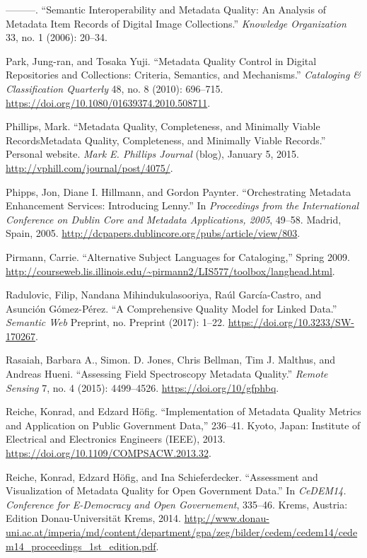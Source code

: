 ———. “Semantic Interoperability and Metadata Quality: An Analysis of Metadata Item Records of Digital Image Collections.” \emph{Knowledge Organization} 33, no. 1 (2006): 20–34.

Park, Jung-ran, and Tosaka Yuji. “Metadata Quality Control in Digital Repositories and Collections: Criteria, Semantics, and Mechanisms.” \emph{Cataloging \& Classification Quarterly} 48, no. 8 (2010): 696–715. \url{https://doi.org/10.1080/01639374.2010.508711}.

Phillips, Mark. “Metadata Quality, Completeness, and Minimally Viable RecordsMetadata Quality, Completeness, and Minimally Viable Records.” Personal website. \emph{Mark E. Phillips Journal} (blog), January 5, 2015. \url{http://vphill.com/journal/post/4075/}.

Phipps, Jon, Diane I. Hillmann, and Gordon Paynter. “Orchestrating Metadata Enhancement Services: Introducing Lenny.” In \emph{Proceedings from the International Conference on Dublin Core and Metadata Applications, 2005}, 49–58. Madrid, Spain, 2005. \url{http://dcpapers.dublincore.org/pubs/article/view/803}.

Pirmann, Carrie. “Alternative Subject Languages for Cataloging,” Spring 2009. \url{http://courseweb.lis.illinois.edu/~pirmann2/LIS577/toolbox/langhead.html}.

Radulovic, Filip, Nandana Mihindukulasooriya, Raúl García-Castro, and Asunción Gómez-Pérez. “A Comprehensive Quality Model for Linked Data.” \emph{Semantic Web} Preprint, no. Preprint (2017): 1–22. \url{https://doi.org/10.3233/SW-170267}.

Rasaiah, Barbara A., Simon. D. Jones, Chris Bellman, Tim J. Malthus, and Andreas Hueni. “Assessing Field Spectroscopy Metadata Quality.” \emph{Remote Sensing} 7, no. 4 (2015): 4499–4526. \url{https://doi.org/10/gfphbq}.

Reiche, Konrad, and Edzard Höfig. “Implementation of Metadata Quality Metrics and Application on Public Government Data,” 236–41. Kyoto, Japan: Institute of Electrical and Electronics Engineers (IEEE), 2013. \url{https://doi.org/10.1109/COMPSACW.2013.32}.

Reiche, Konrad, Edzard Höfig, and Ina Schieferdecker. “Assessment and Visualization of Metadata Quality for Open Government Data.” In \emph{CeDEM14. Conference for E-Democracy and Open Governement}, 335–46. Krems, Austria: Edition Donau-Universität Krems, 2014. \url{http://www.donau-uni.ac.at/imperia/md/content/department/gpa/zeg/bilder/cedem/cedem14/cedem14_proceedings_1st_edition.pdf}.

